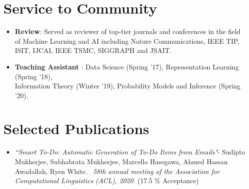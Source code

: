 \documentclass[margin,line]{resume}
\begin{document}
\begin{resume}

\section{\mysidestyle Service to Community} 
 \begin{itemize}
 \vspace{-0.5pt}
 \item \textbf{Review}: Served as reviewer of top-tier journals and conferences in the field of Machine Learning and AI including Nature Communications, IEEE TIP, ISIT, IJCAI, IEEE TSMC, SIGGRAPH and JSAIT.
 \item \textbf{Teaching Assistant} : Data Science (Spring '17), Representation Learning (Spring '18), \\ Information Theory (Winter '19), Probability Models and Inference (Spring '20).
 \end{itemize}

\section{\mysidestyle Selected Publications} 
\begin{itemize}

\item  \emph{``Smart To-Do: Automatic Generation of To-Do Items from Emails"}-  
Sudipto Mukherjee, Subhabrata Mukherjee, Marcello Hasegawa, Ahmed Hassan Awadallah, Ryen White. \, \emph{58th annual meeting of the Association for Computational Linguistics (ACL), 2020.} (17.5 $\%$ Acceptance)



\end{itemize}
\end{resume}
\end{document}
